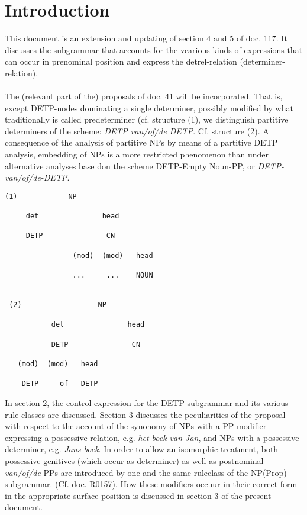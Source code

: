 
   \RosDate{\today}
   \RosSupersedes{-}
   \MakeRosTitle
%
%   
%   
%

\section{Introduction}

This document is an extension and updating of section 4 and 5 of doc. 117.
It discusses the subgrammar that accounts for the vcarious kinds of 
expressions that can occur in prenominal position and express 
the detrel-relation (determiner-relation).
\\ \\
The (relevant part of the) proposals of doc. 41 will be incorporated. That 
is, except DETP-nodes dominating a single determiner, possibly modified by 
what traditionally is called predeterminer (cf. structure (1), 
we distinguish partitive 
determiners of the scheme: {\em DETP van/of/de DETP}. Cf. structure (2).
A consequence of the analysis of partitive NPs by means of a partitive
DETP analysis, embedding of NPs is a more restricted phenomenon than under
alternative analyses base don the scheme {DETP-Empty Noun-PP}, or 
{\em DETP-van/of/de-DETP}.

\begin{verbatim}
(1)            NP

     det               head

     DETP               CN

                (mod)  (mod)   head

                ...     ...    NOUN 


 (2)                  NP

           det               head

           DETP               CN

   (mod)  (mod)   head

    DETP     of   DETP
\end{verbatim}

In section 2, the control-expression for the DETP-subgrammar and its
various rule classes are discussed. 
Section 3 discusses the peculiarities of the
proposal with respect to the account of the synonomy 
of NPs with a PP-modifier expressing a possessive
relation, e.g. {\em het boek van Jan}, and NPs with a possessive determiner,
e.g. {\em Jans boek}. 
In order to allow an isomorphic treatment, both possessive genitives
(which occur as determiner) as well as postnominal {\em van/of/de}-PPs are
introduced by one and the same ruleclass of the NP(Prop)-subgrammar.
(Cf. doc. R0157). How these modifiers occuur in their correct form in the
appropriate surface position is discussed in section 3 of the present 
document. 

